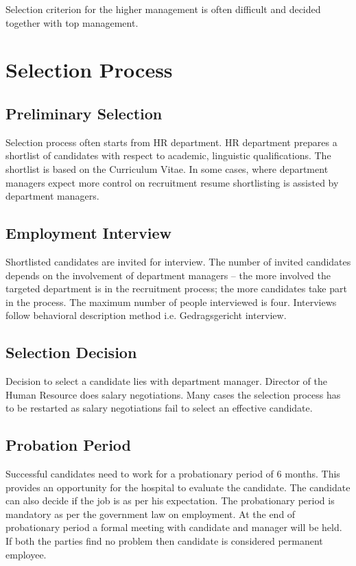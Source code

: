 \documentclass[a4paper,fleqn,11pt,dvips,titlepage]{article}
\numberwithin{figure}{section}
\numberwithin{equation}{section}
\begin{document}
Selection criterion for the higher management is often difficult and decided together with top management.


\section{Selection Process}

\subsection{Preliminary Selection}

Selection process often starts from HR department.
HR department prepares a shortlist of candidates with respect to academic, linguistic qualifications.
The shortlist is based on the Curriculum Vitae.
In some cases, where department managers expect more control on recruitment resume shortlisting is assisted by department managers. 

\subsection{Employment Interview}

Shortlisted candidates are invited for interview.
The number of invited candidates depends on the involvement of department managers – the more involved the targeted department is in the recruitment process; the more candidates take part in the process.
The maximum number of people interviewed is four.
Interviews follow behavioral description method i.e. Gedragsgericht interview. 

\subsection{Selection Decision}

Decision to select a candidate lies with department manager.
Director of the Human Resource does salary negotiations.
Many cases the selection process has to be restarted as salary negotiations fail to select an effective candidate.


\subsection{Probation Period}

Successful candidates need to work for a probationary period of 6 months.
This provides an opportunity for the hospital to evaluate the candidate.
The candidate can also decide if the job is as per his expectation.
The probationary period is mandatory as per the government law on employment.
At the end of probationary period a formal meeting with candidate and manager will be held.
If both the parties find no problem then candidate is considered permanent employee.
\end{document}
